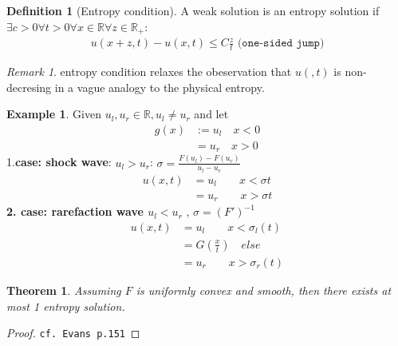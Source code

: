 \documentclass[a4paper,11pt,oneside,fleqn]{book}
\newtheorem{theorem}{Theorem}[section]
\theoremstyle{definition}
\newtheorem{definition}{Definition}[section]
\newtheorem*{example}{Example}
\theoremstyle{remark}
\newtheorem*{remark}{Remark}
\begin{document}
\begin{definition}[Entropy condition]
	A weak solution is an entropy solution if  $\exists c > 0 \forall t > 0 \forall x \in \mathbb{R} \forall z \in \mathbb{R}_+:$
	\begin{align*}
		u(x + z, t) - u(x, t) \le C \frac{z}{t} \texttt{ (one-sided jump)}
	\end{align*}
\end{definition}
\begin{remark}
entropy condition relaxes the obeservation that $u(, t)$ is non-decresing in a vague analogy to the physical entropy. 	
\end{remark}

\begin{example}
Given $u_l, u_r \in \mathbb{R}, u_l \neq u_r$ and let
\begin{align*}
	g(x)&:= u_l \quad x < 0\\
	&= u_r \quad x > 0
\end{align*}	
1.\textbf{case: shock wave}: $u_l > u_r$: $\sigma = \frac{F(u_l) - F(u_r)}{u_l - u_e}$
\begin{align*}
	u(x, t) &= u_l \qquad x < \sigma t\\
	&= u_r \qquad x > \sigma t
\end{align*}
\textbf{2. case: rarefaction wave $u_l < u_r$} , $\sigma = (F')^{-1}$
\begin{align*}
	u(x, t) &= u_l \qquad x < \sigma_l(t) \\
	&= G(\frac{x}{t}) \quad else\\
	&= u_r \qquad x > \sigma_r(t)
\end{align*}
\end{example}

\begin{theorem}
	Assuming $F$ is uniformly convex and smooth, then there exists at most 1 entropy solution. 
\end{theorem}
\begin{proof}
	\texttt{cf. Evans p.151}
\end{proof}
\end{document}
